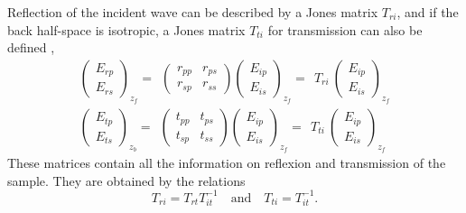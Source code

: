 %
Reflection of the incident wave can be described by a Jones matrix $T_{ri}$, and if the back half-space is isotropic, a Jones matrix $T_{ti}$ for transmission can also be defined \cite{Jones, Fujiwara},
\begin{align*}
\begin{pmatrix}
E_{rp} \\ E_{rs}
\end{pmatrix}_{z_f} \!\! = \ \ 
\begin{pmatrix}
r_{pp} & r_{ps} \\
r_{sp} & r_{ss} 
\end{pmatrix}
\begin{pmatrix}
E_{ip} \\ E_{is}
\end{pmatrix}_{z_f} \!\! = \ \ T_{ri} \ 
\begin{pmatrix}
E_{ip} \\ E_{is}
\end{pmatrix}_{z_f}
\\[3pt]
\begin{pmatrix}
E_{tp} \\ E_{ts}
\end{pmatrix}_{z_b} \!\! = \ \ 
\begin{pmatrix}
t_{pp} & t_{ps} \\
t_{sp} & t_{ss} 
\end{pmatrix}
\begin{pmatrix}
E_{ip} \\ E_{is}
\end{pmatrix}_{z_f} \!\! = \ \ T_{ti} \ 
\begin{pmatrix}
E_{ip} \\ E_{is}
\end{pmatrix}_{z_f}
\end{align*}
These matrices contain all the information on reflexion and transmission of the sample. 
They are obtained by the relations 
$$T_{ri} = T_{rt} T_{it}^{-1} 
\quad\mathrm{and}\quad 
T_{ti} = T_{it}^{-1}.$$


